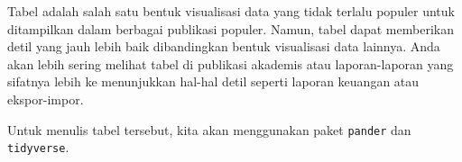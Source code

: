 \documentclass[
]{book}
\newenvironment{Shaded}{\begin{snugshade}}{\end{snugshade}}
\newcommand{\CommentTok}[1]{\textcolor[rgb]{0.56,0.35,0.01}{\textit{#1}}}
\newcommand{\KeywordTok}[1]{\textcolor[rgb]{0.13,0.29,0.53}{\textbf{#1}}}
\newcommand{\NormalTok}[1]{#1}
\newcommand{\OperatorTok}[1]{\textcolor[rgb]{0.81,0.36,0.00}{\textbf{#1}}}
\newcommand{\StringTok}[1]{\textcolor[rgb]{0.31,0.60,0.02}{#1}}
\begin{document}
Tabel adalah salah satu bentuk visualisasi data yang tidak terlalu populer untuk ditampilkan dalam berbagai publikasi populer. Namun, tabel dapat memberikan detil yang jauh lebih baik dibandingkan bentuk visualisasi data lainnya. Anda akan lebih sering melihat tabel di publikasi akademis atau laporan-laporan yang sifatnya lebih ke menunjukkan hal-hal detil seperti laporan keuangan atau ekspor-impor.

Untuk menulis tabel tersebut, kita akan menggunakan paket \texttt{pander} dan \texttt{tidyverse}.

\begin{Shaded}
\end{Shaded}
\end{document}
